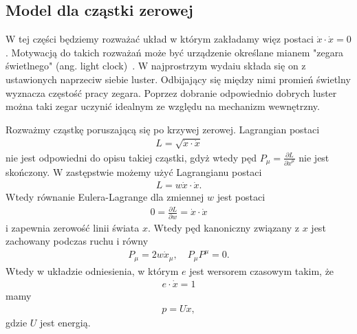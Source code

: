 \subsection{Model dla cząstki zerowej}
W tej części będziemy rozważać układ w którym zakładamy
więz postaci $\dot{x} \cdot \dot{x} = 0$.
Motywacją do takich rozważań może być urządzenie 
określane mianem "zegara świetlnego" (ang. light 
clock)~\cite{Fletcher2013, West2007}.
W najprostrzym wydaiu składa się on z ustawionych 
naprzeciw siebie luster.
Odbijający się między nimi promień świetlny 
wyznacza częstość pracy zegara.
Poprzez dobranie odpowiednio dobrych luster można taki zegar
uczynić idealnym ze względu na mechanizm wewnętrzny.

Rozważmy cząstkę poruszającą się po krzywej zerowej.
Lagrangian postaci
\begin{align}
L = \sqrt{\dot{x} \cdot \dot{x} }
\end{align}
nie jest odpowiedni do opisu takiej cząstki, gdyż 
wtedy pęd $P_\mu = \frac{\partial L}{\partial \dot{x}^\mu}$ 
nie jest skończony. 
W zastępstwie możemy użyć 
Lagrangianu postaci~\cite{}
\begin{align}
L = w\dot{x} \cdot \dot{x}.
\end{align}
Wtedy równanie Eulera-Lagrange dla zmiennej $w$ jest postaci
\begin{align}
0 = \frac{\partial L}{\partial w} =  \dot{x} \cdot \dot{x}
\end{align}
i zapewnia zerowość linii świata $x$. Wtedy pęd
kanoniczny związany z $x$  jest zachowany podczas ruchu i równy
\begin{align}
P_\mu = 2 w \dot{x}_\mu, \quad P_\mu P^\mu = 0.
\end{align}
Wtedy w układzie odniesienia, w 
którym $e$ jest wersorem czasowym
takim, że 
\begin{align}
e\cdot \dot{x}=1
\end{align} 
mamy
\begin{align}
    p = U \dot{x},
\end{align}
gdzie $U$ jest energią.


